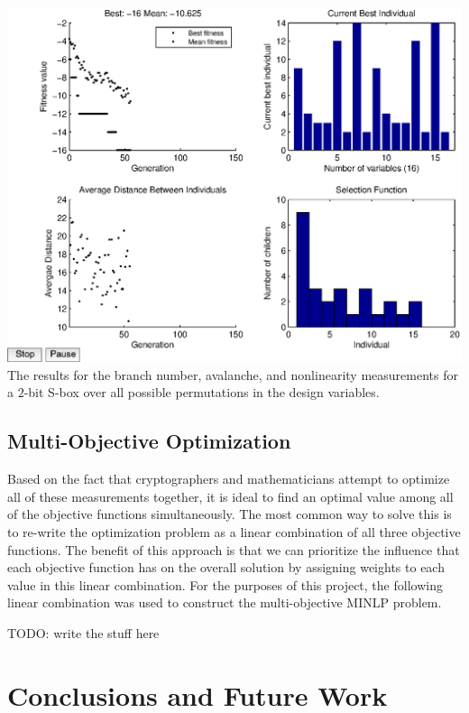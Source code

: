 \documentclass[11pt]{article}
\begin{document}
\begin{center}
	\includegraphics[scale=0.75]{images/nl_results16.eps} \\
	\label{bfjoint}
The results for the branch number, avalanche, and nonlinearity measurements for a $2$-bit S-box over all possible permutations in the design variables. 
\end{center}

\subsection{Multi-Objective Optimization}
Based on the fact that cryptographers and mathematicians attempt to optimize all of these measurements together, it is ideal to find an optimal value among all of the objective functions simultaneously. The most common way to solve this is to re-write the optimization problem as a linear combination of all three objective functions. The benefit of this approach is that we can prioritize the influence that each objective function has on the overall solution by assigning weights to each value in this linear combination. For the purposes of this project, the following linear combination was used to construct the multi-objective MINLP problem.

TODO: write the stuff here


\section{Conclusions and Future Work}
\end{document}
